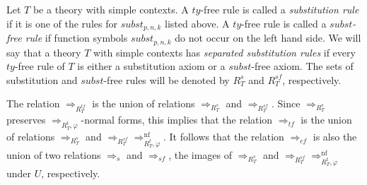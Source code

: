 \documentclass[reqno]{amsart}
\theoremstyle{definition}
\theoremstyle{remark}
\newcommand{\nf}{\mathrm{nf}}
\newcommand{\subst}{\mathit{subst}}
\newcommand{\ty}{\mathit{ty}}
\numberwithin{figure}{section}
\begin{document}
Let $T$ be a theory with simple contexts.
A $\ty$-free rule is called a \emph{substitution rule} if it is one of the rules for $\subst_{p,n,k}$ listed above.
A $\ty$-free rule is called a \emph{$\subst$-free rule} if function symbols $\subst_{p,n,k}$ do not occur on the left hand side.
We will say that a theory $T$ with simple contexts has \emph{separated substitution rules} if every $\ty$-free rule of $T$ is either a substitution axiom or a $\subst$-free axiom.
The sets of substitution and $\subst$-free rules will be denoted by $R^s_T$ and $R^{sf}_T$, respectively.

The relation $\Rightarrow_{R_T^{tf}}$ is the union of relations $\Rightarrow_{R_T^s}$ and $\Rightarrow_{R_T^{sf}}$.
Since $\Rightarrow_{R_T^s}$ preserves $\Rightarrow_{R_T^t,\varphi}$-normal forms, this implies that the relation $\Rightarrow_{tf}$ is the union of relations $\Rightarrow_{R_T^s}$ and $\Rightarrow_{R_T^{sf}} \Rightarrow_{R_T^t,\varphi}^\nf$.
It follows that the relation $\Rightarrow_{cf}$ is also the union of two relations $\Rightarrow_s$ and $\Rightarrow_{sf}$, the images of $\Rightarrow_{R_T^s}$ and $\Rightarrow_{R_T^{sf}} \Rightarrow_{R_T^t,\varphi}^\nf$ under $U$, respectively.
\end{document}
